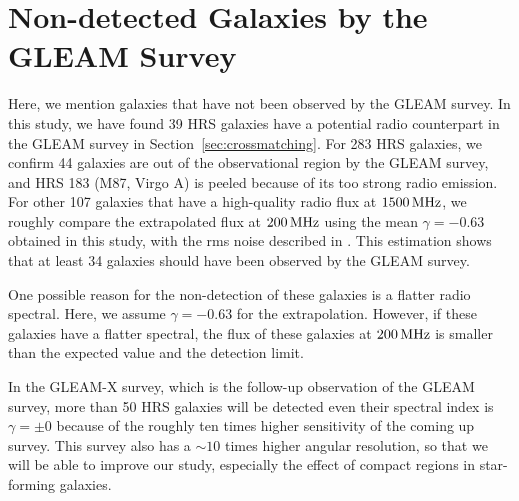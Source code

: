 \section{Non-detected Galaxies by the GLEAM Survey}\label{sec:nondetectedgalaxiesbythegleamsurvey}

Here, we mention galaxies that have not been observed by the GLEAM survey.
In this study, we have found 39 HRS galaxies have a potential radio counterpart in the GLEAM survey in Section~\ref{sec:crossmatching}.
For 283 HRS galaxies, we confirm 44 galaxies are out of the observational region by the GLEAM survey, and HRS 183 (M87, Virgo A) is peeled because of its too strong radio emission.
For other 107 galaxies that have a high-quality radio flux at $1500\,\mathrm{MHz}$, we roughly compare the extrapolated flux at $200\,\mathrm{MHz}$ using the mean $\gamma = -0.63$ obtained in this study, with the rms noise described in \citet{Hurley-Walker2017a}.
This estimation shows that at least 34 galaxies should have been observed by the GLEAM survey.

One possible reason for the non-detection of these galaxies is a flatter radio spectral.
Here, we assume $\gamma = -0.63$ for the extrapolation.
However, if these galaxies have a flatter spectral, the flux of these galaxies at $200\,\mathrm{MHz}$ is smaller than the expected value and the detection limit.

In the GLEAM-X survey, which is the follow-up observation of the GLEAM survey, more than 50 HRS galaxies will be detected even their spectral index is $\gamma = \pm 0$ because of the roughly ten times higher sensitivity of the coming up survey.
This survey also has a $\sim 10$ times higher angular resolution, so that we will be able to improve our study, especially the effect of compact regions in star-forming galaxies.



%
%
